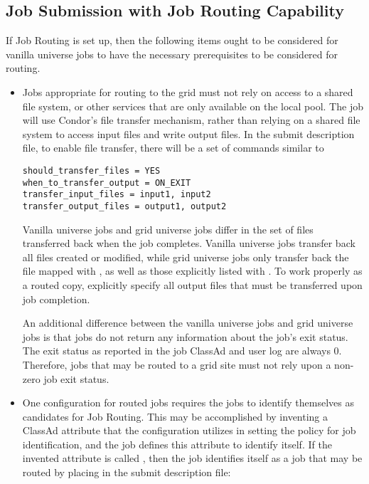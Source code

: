\subsection{\label{sec:RouterJobSubmission}Job Submission with Job Routing Capability}

If Job Routing is set up, then the following items
ought to be considered for vanilla universe jobs to have the
necessary prerequisites to be considered for routing.

\begin{itemize}

\item Jobs appropriate for routing to the grid must not rely on access to
a shared file system, or other services that are only available on the
local pool.
The job will use Condor's file transfer mechanism, 
rather than relying on a shared file system
to access input files and write output files.
In the submit description file, to enable file transfer, there
will be a set of commands similar to

\begin{verbatim}
should_transfer_files = YES
when_to_transfer_output = ON_EXIT
transfer_input_files = input1, input2
transfer_output_files = output1, output2
\end{verbatim}

Vanilla universe jobs and grid universe jobs differ in the
set of files transferred back when the job completes.
Vanilla universe jobs transfer back all files created or modified,
while grid universe jobs only transfer back the file mapped with
, as well as those explicitly listed
with .
To work properly as a routed copy, explicitly specify all
output files that must be transferred upon job completion.

An additional difference between the vanilla universe jobs
and  grid universe jobs
is that  jobs do not return
any information about the job's exit status.
The exit status as reported in the job ClassAd and user log are
always 0.
Therefore, jobs that may be routed to a  grid site
must not rely upon a non-zero job exit status.

\item One configuration for routed jobs requires the jobs to
identify themselves as candidates for Job Routing.
This may be accomplished by inventing a ClassAd attribute
that the configuration utilizes in setting the policy 
for job identification,
and the job defines this attribute to identify itself.
If the invented attribute is called ,
then the job identifies itself as a job that may be routed
by placing in the submit description file:


\end{itemize}
